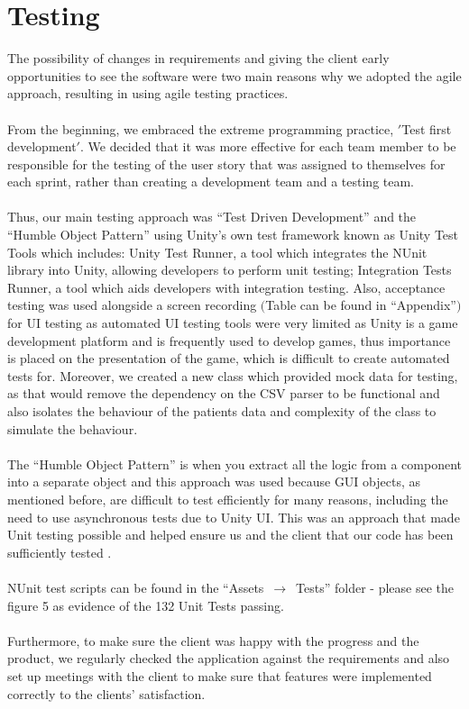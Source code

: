 \documentclass[11pt,english, titlepage]{article}
\begin{document}
  \section*{Testing}
  The possibility of changes in requirements and giving the client early opportunities to see the software were two main reasons why we adopted the agile approach, resulting in using agile testing practices. \\
  \\
  From the beginning, we embraced the extreme programming practice, $'$Test first development$'$. We decided that it was more effective for each team member to be responsible for the testing of the user story that was assigned to themselves for each sprint, rather than creating a development team and a testing team. \\
  \\
  Thus, our main testing approach was ``Test Driven Development'' and the ``Humble Object Pattern'' using Unity's own test framework known as Unity Test Tools which includes: Unity Test Runner, a tool which integrates the NUnit library into Unity, allowing developers to perform unit testing; Integration Tests Runner, a tool which aids developers with integration testing. Also, acceptance testing was used alongside a screen recording $($Table can be found in ``Appendix''$)$ for UI testing as automated UI testing tools were very limited as Unity is a game development platform and is frequently used to develop games, thus importance is placed on the presentation of the game, which is difficult to create automated tests for. Moreover, we created a new class which provided mock data for testing, as that would remove the dependency on the CSV parser to be functional and also isolates the behaviour of the patients data and complexity of the class to simulate the behaviour. \\
  \\
  The ``Humble Object Pattern'' is when you extract all the logic from a component into a separate object and this approach was used because GUI objects, as mentioned before, are difficult to test efficiently for many reasons, including the need to use asynchronous tests due to Unity UI. This was an approach that made Unit testing possible and helped ensure us and the client that our code has been sufficiently tested .\\
  \\
  NUnit test scripts can be found in the ``Assets $\,\to\,$ Tests'' folder - please see the figure 5 as evidence of the 132 Unit Tests passing.\\
  \\
  Furthermore, to make sure the client was happy with the progress and the product, we regularly checked the application against the requirements and also set up meetings with the client to make sure that features were implemented correctly to the clients' satisfaction.
\end{document}
